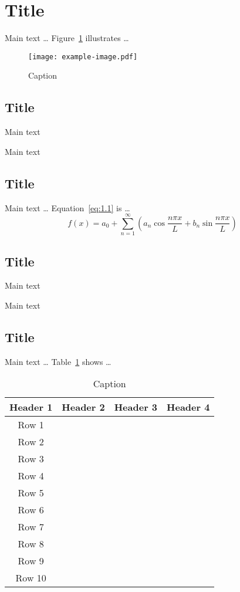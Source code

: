 \documentclass[degree=doctor,language=english]{sysuthesis}
\begin{document}
\section{Title}

Main text … Figure~\ref{fig:1.1} illustrates …

\begin{figure}
  \centering
  \texttt{[image: example-image.pdf]}
  \caption{Caption}
  \label{fig:1.1}
\end{figure}

\subsection{Title}

Main text

Main text

\subsection{Title}

Main text … Equation~\eqref{eq:1.1} is …
\begin{equation}
  f(x) = a_0 + \sum_{n=1}^\infty \left( a_n \cos⁡ \frac{n \pi x}{L}
    + b_n \sin⁡ \frac{n \pi x}{L} \right)
  \label{eq:1.1}
\end{equation}

\subsection{Title}

Main text

Main text

\subsection{Title}

Main text … Table~\ref{tab:1.1} shows …

\begin{table}
  \centering
  \caption{Caption}
  \label{tab:1.1}
  \begin{tabular}{cccc}
    \toprule
    Header 1 & Header 2 & Header 3 & Header 4 \\
    \midrule
    Row 1 &  &  & \\
    Row 2 &  &  & \\
    Row 3 &  &  & \\
    Row 4 &  &  & \\
    Row 5 &  &  & \\
    Row 6 &  &  & \\
    Row 7 &  &  & \\
    Row 8 &  &  & \\
    Row 9 &  &  & \\
    Row 10 &  &  & \\
    \bottomrule
  \end{tabular}
\end{table}
\end{document}
